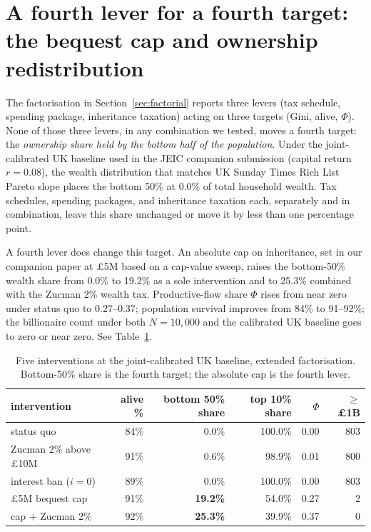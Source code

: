 \documentclass[11pt]{article}
\begin{document}
\section{A fourth lever for a fourth target: the bequest cap and
ownership redistribution}
\label{sec:cap-as-fourth}

The factorisation in Section~\ref{sec:factorial} reports three
levers (tax schedule, spending package, inheritance taxation)
acting on three targets (Gini, alive, $\Phi$).  None of those three
levers, in any combination we tested, moves a fourth target: the
\emph{ownership share held by the bottom half of the population}.
Under the joint-calibrated UK baseline used in the JEIC companion
submission (capital return $r = 0.08$), the wealth distribution
that matches UK Sunday Times Rich List Pareto slope places the
bottom 50\% at 0.0\% of total household wealth.  Tax schedules,
spending packages, and inheritance taxation each, separately and
in combination, leave this share unchanged or move it by less than
one percentage point.

A fourth lever does change this target.  An absolute cap on
inheritance, set in our companion paper at \pounds 5M based on a
cap-value sweep, raises the bottom-50\% wealth share from 0.0\% to
19.2\% as a sole intervention and to 25.3\% combined with the
Zucman 2\% wealth tax.  Productive-flow share $\Phi$ rises from
near zero under status quo to 0.27--0.37; population survival
improves from 84\% to 91--92\%; the billionaire count under both
$N = 10{,}000$ and the calibrated UK baseline goes to zero or near
zero.  See Table~\ref{tab:cap-fourth}.

\begin{table}[h]
\centering
\small
\caption{Five interventions at the joint-calibrated UK baseline,
extended factorisation.  Bottom-50\% share is the fourth target;
the absolute cap is the fourth lever.}
\label{tab:cap-fourth}
\begin{tabular}{lrrrrr}
\toprule
intervention & alive \% & bottom 50\% share & top 10\% share
& $\Phi$ & $\geq$\pounds 1B \\
\midrule
status quo                & 84\% &  0.0\%  & 100.0\% & 0.00 & 803 \\
Zucman 2\% above \pounds 10M & 91\% &  0.6\%  &  98.9\% & 0.01 & 800 \\
interest ban ($i=0$)      & 89\% &  0.0\%  & 100.0\% & 0.00 & 803 \\
\pounds 5M bequest cap     & 91\% & \textbf{19.2\%} & 54.0\% & 0.27 &   2 \\
cap + Zucman 2\%           & 92\% & \textbf{25.3\%} & 39.9\% & 0.37 &   0 \\
\bottomrule
\end{tabular}
\end{table}
\end{document}
